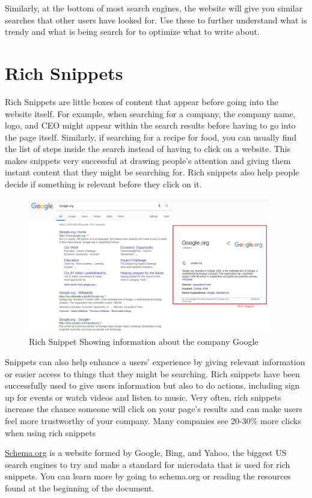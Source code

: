 \documentclass{article}
\begin{document}
Similarly, at the bottom of most search engines, the website will give you similar searches that other users have looked for. Use these to further understand what is trendy and what is being search for to optimize what to write about.

\section{Rich Snippets}
Rich Snippets are little boxes of content that appear before going into the website itself. For example, when searching for a company, the company name, logo, and CEO might appear within the search results before having to go into the page itself. Similarly, if searching for a recipe for food, you can usually find the list of steps inside the search instead of having to click on a website. This makes snippets very successful at drawing people's attention and giving them instant content that they might be searching for. Rich snippets also help people decide if something is relevant before they click on it.

\begin{figure}[h]
\centering
\includegraphics[width=400px]{images/richsnippet.png}
\caption{Rich Snippet Showing information about the company Google}
\end{figure}


Snippets can also help enhance a users' experience by giving relevant information or easier access to things that they might be searching. Rich snippets have been successfully used to give users information but also to do actions, including sign up for events or watch videos and listen to music. Very often, rich snippets increase the chance someone will click on your page's results and can make users feel more trustworthy of your company. Many companies see 20-30\% more clicks when using rich snippets

\hyperlink{www.schema.org}{Schema.org} is a website formed by Google, Bing, and Yahoo, the biggest US search engines to try and make a standard for microdata that is used for rich snippets. You can learn more by going to schema.org or reading the resources found at the beginning of the document.
\end{document}
